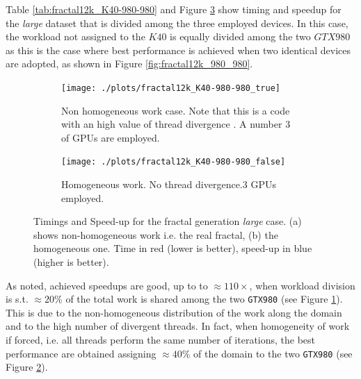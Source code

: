 Table \ref{tab:fractal12k_K40-980-980} and Figure \ref{fig:fractal12k_K40-980-980} show timing and speedup for the \textit{large} dataset that is divided among the three employed devices. In this case, the workload not assigned to the $K40$ is equally divided among the two $GTX980$ as this is the case where best performance is achieved when two identical devices are adopted, as shown in  Figure \ref{fig:fractal12k_980_980}.
\begin{figure}
    \begin{subfigure}{1.0\textwidth}
        \caption{Non homogeneous work case. Note that this is a code with an high value of thread divergence . A number $3$ of GPUs are employed.}
        \texttt{[image: ./plots/fractal12k\_K40-980-980\_true]}
                \label{fig:fractal12k_K40-980-980_true}
    \end{subfigure}        
    \endminipage \hfill
    \vspace{5mm}
    \begin{subfigure}{1.0\textwidth}
                \texttt{[image: ./plots/fractal12k\_K40-980-980\_false]}
        \caption{Homogeneous work. No thread divergence.$3$ GPUs employed. }
        \label{fig:fractal12k_K40-980-980_false}
    \end{subfigure}
    \endminipage\hfill
\caption[Timings and Speed-up for the fractal generation \textit{large} case.]{Timings and Speed-up for the fractal generation \textit{large} case. (a) shows non-homogeneous work i.e. the real fractal, (b) the homogeneous one. Time in red (lower is better), speed-up in blue (higher is better).}
    \label{fig:fractal12k_K40-980-980}
\end{figure}
As noted, achieved speedups are good, up to to $\approx 110 \times$, when workload division is s.t. $\approx 20\%$ of the total work is shared among the two \texttt{GTX980} (see Figure \ref{fig:fractal12k_K40-980-980_true}). 
This is due to the non-homogeneous distribution of the work along the domain and to the high number of divergent threads. In fact, when homogeneity of work if forced, i.e. all threads perform the same number of iterations, the best performance are obtained assigning $\approx 40\%$  of the domain to the two \texttt{GTX980} (see Figure \ref{fig:fractal12k_K40-980-980_false}).

